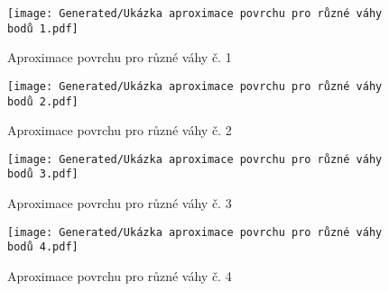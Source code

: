 \begin{imagepage}
    \begin{figure}[H]
        \centering
        \texttt{[image: Generated/Ukázka aproximace povrchu pro různé váhy bodů 1.pdf]}
        \caption{Aproximace povrchu pro různé váhy č. 1}
        \label{fig:Demo aproximace povrchu pro různé váhy č. 1}
    \end{figure}
    \begin{figure}[H]
        \centering
        \texttt{[image: Generated/Ukázka aproximace povrchu pro různé váhy bodů 2.pdf]}
        \caption{Aproximace povrchu pro různé váhy č. 2}
        \label{fig:Demo aproximace povrchu pro různé váhy č. 2}
    \end{figure}
\end{imagepage}

\begin{imagepage}
    \begin{figure}[H]
        \centering
        \texttt{[image: Generated/Ukázka aproximace povrchu pro různé váhy bodů 3.pdf]}
        \caption{Aproximace povrchu pro různé váhy č. 3}
        \label{fig:Demo aproximace povrchu pro různé váhy č. 3}
    \end{figure}
    \begin{figure}[H]
        \centering
        \texttt{[image: Generated/Ukázka aproximace povrchu pro různé váhy bodů 4.pdf]}
        \caption{Aproximace povrchu pro různé váhy č. 4}
        \label{fig:Demo aproximace povrchu pro různé váhy č. 4}
    \end{figure}
\end{imagepage}